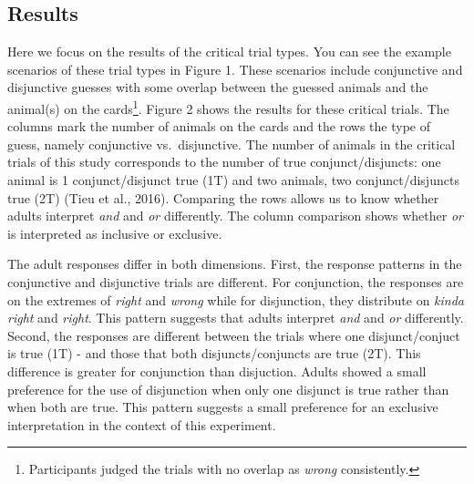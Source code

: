 \documentclass[10pt, letterpaper]{article}
\begin{document}
\subsection{Results}\label{results}

Here we focus on the results of the critical trial types. You can see
the example scenarios of these trial types in Figure 1. These scenarios
include conjunctive and disjunctive guesses with some overlap between
the guessed animals and the animal(s) on the
cards\footnote{Participants judged the trials with no overlap as \textit{wrong} consistently.}.
Figure 2 shows the results for these critical trials. The columns mark
the number of animals on the cards and the rows the type of guess,
namely conjunctive vs.~disjunctive. The number of animals in the
critical trials of this study corresponds to the number of true
conjunct/disjuncts: one animal is 1 conjunct/disjunct true (1T) and two
animals, two conjunct/disjuncts true (2T) (Tieu et al., 2016). Comparing
the rows allows us to know whether adults interpret \emph{and} and
\emph{or} differently. The column comparison shows whether \emph{or} is
interpreted as inclusive or exclusive.

The adult responses differ in both dimensions. First, the response
patterns in the conjunctive and disjunctive trials are different. For
conjunction, the responses are on the extremes of \emph{right} and
\emph{wrong} while for disjunction, they distribute on \emph{kinda
right} and \emph{right}. This pattern suggests that adults interpret
\emph{and} and \emph{or} differently. Second, the responses are
different between the trials where one disjunct/conjuct is true (1T) -
and those that both disjuncts/conjuncts are true (2T). This difference
is greater for conjunction than disjuction. Adults showed a small
preference for the use of disjunction when only one disjunct is true
rather than when both are true. This pattern suggests a small preference
for an exclusive interpretation in the context of this experiment.
\end{document}
